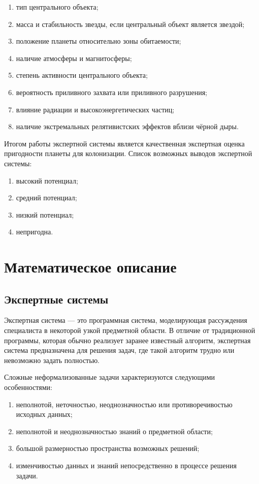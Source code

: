 \documentclass[14pt,a4paper]{extarticle}
\begin{document}
\begin{enumerate}
    \item тип центрального объекта;
    \item масса и стабильность звезды, если центральный объект является звездой;
    \item положение планеты относительно зоны обитаемости;
    \item наличие атмосферы и магнитосферы;
    \item степень активности центрального объекта;
    \item вероятность приливного захвата или приливного разрушения;
    \item влияние радиации и высокоэнергетических частиц;
    \item наличие экстремальных релятивистских эффектов вблизи чёрной дыры.
\end{enumerate}

Итогом работы экспертной системы является качественная экспертная оценка пригодности планеты для колонизации. Список возможных выводов экспертной системы:

\begin{enumerate}
    \item высокий потенциал;
    \item средний потенциал;
    \item низкий потенциал;
    \item непригодна.
\end{enumerate}

\newpage

\section{Математическое описание}

\subsection{Экспертные системы}

Экспертная система --- это программная система, моделирующая рассуждения специалиста в некоторой узкой предметной области. В отличие от традиционной программы, которая обычно реализует заранее известный алгоритм, экспертная система предназначена для решения задач, где такой алгоритм трудно или невозможно задать полностью.

Сложные неформализованные задачи характеризуются следующими особенностями:

\begin{enumerate}
    \item неполнотой, неточностью, неоднозначностью или противоречивостью исходных данных;
    \item неполнотой и неоднозначностью знаний о предметной области;
    \item большой размерностью пространства возможных решений;
    \item изменчивостью данных и знаний непосредственно в процессе решения задачи.
\end{enumerate}
\end{document}
